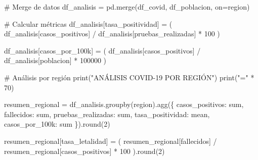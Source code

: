 \documentclass[
  doc,
  floatsintext,
  longtable,
  a4paper,
  nolmodern,
  notxfonts,
  notimes,
  12pt,
  colorlinks=true,linkcolor=blue,citecolor=blue,urlcolor=blue]{apa7}
\newenvironment{Shaded}{\begin{snugshade}}{\end{snugshade}}
\newcommand{\BuiltInTok}[1]{\textcolor[rgb]{0.00,0.23,0.31}{#1}}
\newcommand{\CommentTok}[1]{\textcolor[rgb]{0.37,0.37,0.37}{#1}}
\newcommand{\DecValTok}[1]{\textcolor[rgb]{0.68,0.00,0.00}{#1}}
\newcommand{\NormalTok}[1]{\textcolor[rgb]{0.00,0.23,0.31}{#1}}
\newcommand{\OperatorTok}[1]{\textcolor[rgb]{0.37,0.37,0.37}{#1}}
\newcommand{\StringTok}[1]{\textcolor[rgb]{0.13,0.47,0.30}{#1}}
\begin{document}
\begin{Shaded}
\begin{Highlighting}[]
\CommentTok{\# Merge de datos}
\NormalTok{df\_analisis }\OperatorTok{=}\NormalTok{ pd.merge(df\_covid, df\_poblacion, on}\OperatorTok{=}\StringTok{\textquotesingle{}region\textquotesingle{}}\NormalTok{)}

\CommentTok{\# Calcular métricas}
\NormalTok{df\_analisis[}\StringTok{\textquotesingle{}tasa\_positividad\textquotesingle{}}\NormalTok{] }\OperatorTok{=}\NormalTok{ (}
\NormalTok{    df\_analisis[}\StringTok{\textquotesingle{}casos\_positivos\textquotesingle{}}\NormalTok{] }\OperatorTok{/}\NormalTok{ df\_analisis[}\StringTok{\textquotesingle{}pruebas\_realizadas\textquotesingle{}}\NormalTok{] }\OperatorTok{*} \DecValTok{100}
\NormalTok{)}

\NormalTok{df\_analisis[}\StringTok{\textquotesingle{}casos\_por\_100k\textquotesingle{}}\NormalTok{] }\OperatorTok{=}\NormalTok{ (}
\NormalTok{    df\_analisis[}\StringTok{\textquotesingle{}casos\_positivos\textquotesingle{}}\NormalTok{] }\OperatorTok{/}\NormalTok{ df\_analisis[}\StringTok{\textquotesingle{}poblacion\textquotesingle{}}\NormalTok{] }\OperatorTok{*} \DecValTok{100000}
\NormalTok{)}

\CommentTok{\# Análisis por región}
\BuiltInTok{print}\NormalTok{(}\StringTok{"ANÁLISIS COVID{-}19 POR REGIÓN"}\NormalTok{)}
\BuiltInTok{print}\NormalTok{(}\StringTok{"="} \OperatorTok{*} \DecValTok{70}\NormalTok{)}

\NormalTok{resumen\_regional }\OperatorTok{=}\NormalTok{ df\_analisis.groupby(}\StringTok{\textquotesingle{}region\textquotesingle{}}\NormalTok{).agg(\{}
    \StringTok{\textquotesingle{}casos\_positivos\textquotesingle{}}\NormalTok{: }\StringTok{\textquotesingle{}sum\textquotesingle{}}\NormalTok{,}
    \StringTok{\textquotesingle{}fallecidos\textquotesingle{}}\NormalTok{: }\StringTok{\textquotesingle{}sum\textquotesingle{}}\NormalTok{,}
    \StringTok{\textquotesingle{}pruebas\_realizadas\textquotesingle{}}\NormalTok{: }\StringTok{\textquotesingle{}sum\textquotesingle{}}\NormalTok{,}
    \StringTok{\textquotesingle{}tasa\_positividad\textquotesingle{}}\NormalTok{: }\StringTok{\textquotesingle{}mean\textquotesingle{}}\NormalTok{,}
    \StringTok{\textquotesingle{}casos\_por\_100k\textquotesingle{}}\NormalTok{: }\StringTok{\textquotesingle{}sum\textquotesingle{}}
\NormalTok{\}).}\BuiltInTok{round}\NormalTok{(}\DecValTok{2}\NormalTok{)}

\NormalTok{resumen\_regional[}\StringTok{\textquotesingle{}tasa\_letalidad\textquotesingle{}}\NormalTok{] }\OperatorTok{=}\NormalTok{ (}
\NormalTok{    resumen\_regional[}\StringTok{\textquotesingle{}fallecidos\textquotesingle{}}\NormalTok{] }\OperatorTok{/}\NormalTok{ resumen\_regional[}\StringTok{\textquotesingle{}casos\_positivos\textquotesingle{}}\NormalTok{] }\OperatorTok{*} \DecValTok{100}
\NormalTok{).}\BuiltInTok{round}\NormalTok{(}\DecValTok{2}\NormalTok{)}


\end{Highlighting}
\end{Shaded}
\end{document}

